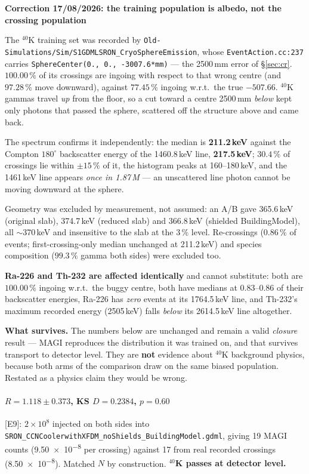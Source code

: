 \documentclass[11pt,a4paper]{article}
\newcommand{\ev}[1]{{\footnotesize\textcolor{prov}{[#1]}}}
\newenvironment{callout}[3]%
{\par\medskip\noindent
 \def\calloutframe{#1}\def\calloutback{#2}%
 \setlength{\fboxrule}{0.9pt}\setlength{\fboxsep}{8pt}%
 \begin{lrbox}{\calloutbox}%
 \begin{minipage}{\dimexpr\textwidth-2\fboxsep-2\fboxrule\relax}%
 \setlength{\parskip}{4pt}%
 \textcolor{#1}{\textbf{#3}}\par\nobreak\smallskip}
{\end{minipage}\end{lrbox}%
 \fcolorbox{\calloutframe}{\calloutback}{\usebox{\calloutbox}}%
 \par\medskip}
\begin{document}
\begin{callout}{warn}{red!4}{Correction 17/08/2026: the training population is
albedo, not the crossing population}
The $^{40}$K training set was recorded by
\texttt{Old-Simulations/Sim/S1GDMLSRON\_CryoSphereEmission},
whose \texttt{EventAction.cc:237} carries
\texttt{SphereCenter(0., 0., -3007.6*mm)} --- the 2500\,mm error of
\S\ref{sec:cr}. \textbf{$100.00\,\%$} of its crossings are ingoing with respect
to that wrong centre (and $97.28\,\%$ move downward), against $77.45\,\%$
ingoing w.r.t.\ the true $-507.66$. $^{40}$K gammas travel \emph{up} from the
floor, so a cut toward a centre 2500\,mm \emph{below} kept only photons that
passed the sphere, scattered off the structure above and came back.

The spectrum confirms it independently: the median is \textbf{211.2\,keV}
against the Compton $180^\circ$ backscatter energy of the 1460.8\,keV line,
\textbf{217.5\,keV}; $30.4\,\%$ of crossings lie within $\pm15\,\%$ of it, the
histogram peaks at 160--180\,keV, and the 1461\,keV line appears \emph{once in
1.87\,M} --- an unscattered line photon cannot be moving downward at the sphere.

Geometry was excluded by measurement, not assumed: an A/B gave 365.6\,keV
(original slab), 374.7\,keV (reduced slab) and 366.8\,keV (shielded
BuildingModel), all $\sim$370\,keV and insensitive to the slab at the $3\,\%$
level. Re-crossings ($0.86\,\%$ of events; first-crossing-only median unchanged
at 211.2\,keV) and species composition ($99.3\,\%$ gamma both sides) were
excluded too.

\textbf{Ra-226 and Th-232 are affected identically} and cannot substitute:
both are $100.00\,\%$ ingoing w.r.t.\ the buggy centre, both have medians at
$0.83$--$0.86$ of their backscatter energies, Ra-226 has \emph{zero} events at
its 1764.5\,keV line, and Th-232's maximum recorded energy (2505\,keV) falls
\emph{below} its 2614.5\,keV line altogether.

\textbf{What survives.} The numbers below are unchanged and remain a valid
\emph{closure} result --- MAGI reproduces the distribution it was trained on,
and that survives transport to detector level. They are \textbf{not} evidence
about $^{40}$K background physics, because both arms of the comparison draw on
the same biased population. Restated as a physics claim they would be wrong.
\end{callout}

\paragraph{$R = \mathbf{1.118 \pm 0.373}$, KS $D = 0.2384$, $p = 0.60$}
\ev{E9}: $2\times10^{8}$ injected on both sides into
\texttt{SRON\_CCNCoolerwithXFDM\_noShields\_BuildingModel.gdml}, giving 19 MAGI
counts (\num{9.50e-8} per crossing) against 17 from real recorded crossings
(\num{8.50e-8}). Matched $N$ by construction. \textbf{$^{40}$K passes at
detector level.}
\end{document}
